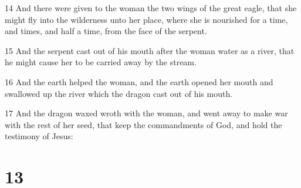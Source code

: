 \par 14 And there were given to the woman the two wings of the great eagle, that she might fly into the wilderness unto her place, where she is nourished for a time, and times, and half a time, from the face of the serpent.
\par 15 And the serpent cast out of his mouth after the woman water as a river, that he might cause her to be carried away by the stream.
\par 16 And the earth helped the woman, and the earth opened her mouth and swallowed up the river which the dragon cast out of his mouth.
\par 17 And the dragon waxed wroth with the woman, and went away to make war with the rest of her seed, that keep the commandments of God, and hold the testimony of Jesus:

\chapter{13}

